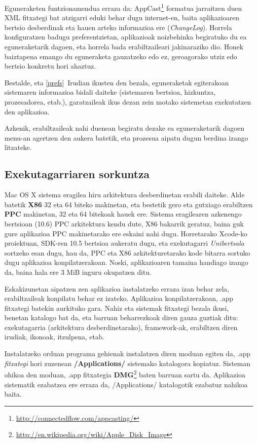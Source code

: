 Eguneraketen funtzionamendua erraza da: AppCast\footnote{\url{http://connectedflow.com/appcasting/}} formatua jarraitzen duen XML fitxategi bat atzigarri eduki behar dugu internet-en, baita aplikazioaren bertsio desberdinak eta hauen arteko informazioa ere (\textit{ChangeLog}). Horrela konfiguratzen badugu preferentzietan, aplikazioak noizbehinka begiratuko du ea eguneraketarik dagoen, eta horrela bada erabiltzaileari jakinaraziko dio. Honek baiztapena emango du eguneraketa gauzatzeko edo ez, geroagorako utziz edo bertsio konkretu hori ahaztuz.

Bestalde, eta \ref{prefs}~Irudian ikusten den bezala, eguneraketak egiterakoan sistemaren informazioa bidali daiteke (sistemaren bertsioa, hizkuntza, prozesadorea, etab.), garatzaileak ikus dezan zein motako sistemetan exekutatzen den aplikazioa.

Azkenik, erabiltzaileak nahi duenean begiratu dezake ea eguneraketarik dagoen menu-an agertzen den aukera batetik, eta prozesua aipatu dugun berdina izango litzateke.

\subsection{Exekutagarriaren sorkuntza}
Mac OS X sistema eragilea hiru arkitektura desberdinetan erabili daiteke. Alde batetik \textbf{X86} 32 eta 64 biteko makinetan, eta bestetik gero eta gutxiago erabiltzen \textbf{PPC} makinetan, 32 eta 64 bitekoak hauek ere. Sistema eragilearen azkenengo bertsioan (10.6) PPC arkitektura kendu dute, X86 bakarrik geratuz, baina guk gure aplikazioa PPC makinetarako ere eskaini nahi dugu. Horretarako Xcode-ko proiektuan, SDK-ren 10.5 bertsioa aukeratu dugu, eta exekutagarri \textit{Unibertsala} sortzeko esan dugu, hau da, PPC eta X86 arkitekturetarako kode bitarra sortuko dugu aplikazioa konpilatzerakoan. Noski, aplikazioaren tamaina handiago izango da, baina hala ere 3 MiB inguru okupatzen ditu.

Eskakizunetan aipatzen zen aplikazioa instalatzeko erraza izan behar zela, erabiltzaileak konpilatu behar ez izateko. Aplikazioa konpilatzerakoan, .app fitxategi batekin aurkituko gara. Nahiz eta sistemak fitxategi bezala ikusi, benetan katalogo bat da, eta barruan beharrezkoak diren gauza guztiak ditu: exekutagarria (arkitektura desberdinetarako), framework-ak, erabiltzen diren irudiak, ikonoak, itzulpena, etab.

Instalatzeko orduan programa gehienak instalatzen diren moduan egiten da, .app \textit{fitxategi} hori zuzenean \textbf{/Applications/} sistemako katalogora kopiatuz. Sisteman ohikoa den moduan, .app fitxategia \textbf{DMG}\footnote{\url{http://en.wikipedia.org/wiki/Apple_Disk_Image}} baten barruan sartu da. Aplikazioa sistematik ezabatzea ere erraza da, /Applications/ katalogotik ezabatuz nahikoa baita.

